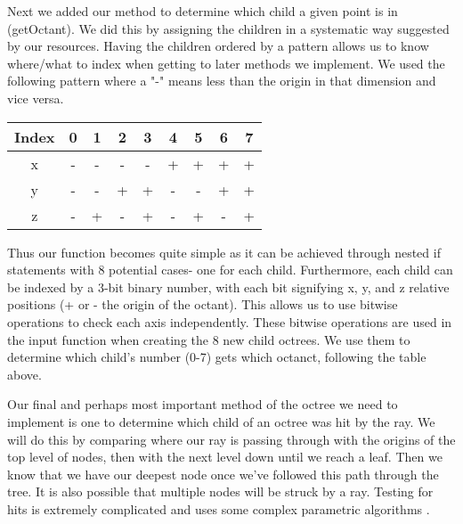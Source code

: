         \par Next we added our method to determine which child a given point is in (getOctant). We did this by assigning the children in a systematic way suggested by our resources. Having the children ordered by a pattern allows us to know where/what to index when getting to later methods we implement. We used the following pattern where a "-" means less than the origin in that dimension and vice versa. \newline\newline
        \begin{tabular}{ccccccccc}
          Index & 0 & 1 & 2 & 3 & 4 & 5 & 6 & 7 \\
          \hline
          x & - & - & - & - & + & + & + & + \\
          y & - & - & + & + & - & - & + & + \\
          z & - & + & - & + & - & + & - & + \end{tabular} 
        \newline\newline
        Thus our function becomes quite simple as it can be achieved through nested if statements with 8 potential cases- one for each child. Furthermore, each child can be indexed by a 3-bit binary number, with each bit signifying x, y, and z relative positions (+ or - the origin of the octant). This allows us to use bitwise operations to check each axis independently. These bitwise operations are used in the input function when creating the 8 new child octrees. We use them to determine which child's number (0-7) gets which octanct, following the table above.
        \par Our final and perhaps most important method of the octree we need to implement is one to determine which child of an octree was hit by the ray. We will do this by comparing where our ray is passing through with the origins of the top level of nodes, then with the next level down until we reach a leaf. Then we know that we have our deepest node once we've followed this path through the tree. It is also possible that multiple nodes will be struck by a ray. Testing for hits is extremely complicated and uses some complex parametric algorithms \cite{traversal}.
       
